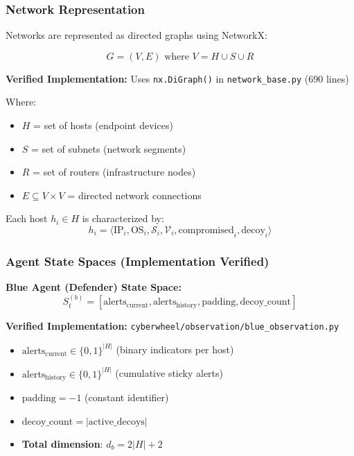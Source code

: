 \documentclass[11pt]{article}
\begin{document}
\subsubsection{Network Representation}

Networks are represented as directed graphs using NetworkX:

\begin{equation}
G = (V, E) \text{ where } V = H \cup S \cup R
\end{equation}

\textbf{Verified Implementation:} Uses \texttt{nx.DiGraph()} in \texttt{network\_base.py} (690 lines)

Where:
\begin{itemize}
\item $H$ = set of hosts (endpoint devices)
\item $S$ = set of subnets (network segments)  
\item $R$ = set of routers (infrastructure nodes)
\item $E \subseteq V \times V$ = directed network connections
\end{itemize}

Each host $h_i \in H$ is characterized by:
\begin{equation}
h_i = \langle \text{IP}_i, \text{OS}_i, \mathcal{S}_i, \mathcal{V}_i, \text{compromised}_i, \text{decoy}_i \rangle
\end{equation}

\subsubsection{Agent State Spaces (Implementation Verified)}

\textbf{Blue Agent (Defender) State Space:}
\begin{equation}
S_t^{(b)} = [\text{alerts}_{\text{current}}, \text{alerts}_{\text{history}}, \text{padding}, \text{decoy\_count}]
\end{equation}

\textbf{Verified Implementation:} \texttt{cyberwheel/observation/blue\_observation.py}
\begin{itemize}
\item $\text{alerts}_{\text{current}} \in \{0,1\}^{|H|}$ (binary indicators per host)
\item $\text{alerts}_{\text{history}} \in \{0,1\}^{|H|}$ (cumulative sticky alerts)
\item $\text{padding} = -1$ (constant identifier)
\item $\text{decoy\_count} = |\text{active\_decoys}|$
\item \textbf{Total dimension}: $d_b = 2|H| + 2$
\end{itemize}
\end{document}
